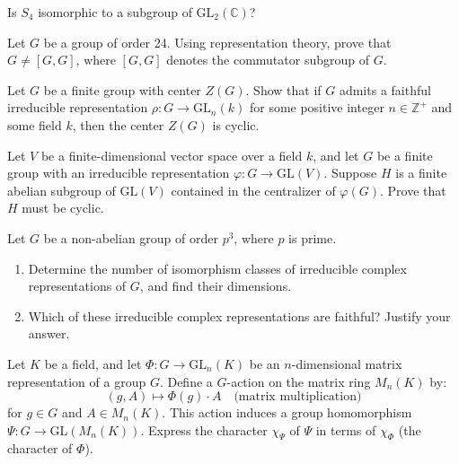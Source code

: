 \begin{prob}[S2018-Q4, S2007-Q5]
    Is $S_4$ isomorphic to a subgroup of $\text{GL}_2(\mathbb{C})$?
\end{prob}

\begin{prob}[S2010-Q6]
    Let \( G \) be a group of order 24. Using representation theory, prove that \( G \neq [G, G] \), where \([G, G]\) denotes the commutator subgroup of \( G \).
\end{prob}

\begin{prob}[F2017-Q6]
    Let \( G \) be a finite group with center \( Z(G) \). Show that if \( G \) admits a faithful irreducible representation \( \rho \colon G \to \mathrm{GL}_n(k) \) for some positive integer \( n \in \mathbb{Z}^+ \) and some field \( k \), then the center \( Z(G) \) is cyclic.
\end{prob}


\begin{prob}[S2005-Q6]
    Let \( V \) be a finite-dimensional vector space over a field \( k \), and let \( G \) be a finite group with an irreducible representation \( \varphi \colon G \to \mathrm{GL}(V) \). Suppose \( H \) is a finite abelian subgroup of \( \mathrm{GL}(V) \) contained in the centralizer of \( \varphi(G) \). Prove that \( H \) must be cyclic.
\end{prob}


\begin{prob}[F2010-Q6]
    Let \( G \) be a non-abelian group of order \( p^3 \), where \( p \) is prime.
    
    \begin{enumerate}
        \item Determine the number of isomorphism classes of irreducible complex representations of \( G \), and find their dimensions.
        
        \item Which of these irreducible complex representations are faithful? Justify your answer.
    \end{enumerate}
\end{prob}


\begin{prob}[S2011-Q5]
    Let \( K \) be a field, and let \( \Phi \colon G \to \mathrm{GL}_n(K) \) be an \( n \)-dimensional matrix representation of a group \( G \). Define a \( G \)-action on the matrix ring \( M_n(K) \) by:
\[
(g, A) \mapsto \Phi(g) \cdot A \quad \text{(matrix multiplication)}
\]
for \( g \in G \) and \( A \in M_n(K) \). This action induces a group homomorphism \( \Psi \colon G \to \mathrm{GL}(M_n(K)) \). Express the character \( \chi_\Psi \) of \( \Psi \) in terms of \( \chi_\Phi \) (the character of \( \Phi \)).
\end{prob}


